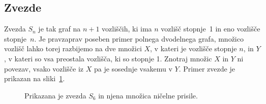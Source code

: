 \documentclass[12pt,a4paper,twoside]{article}
\theoremstyle{definition} %
\theoremstyle{plain} %
\numberwithin{equation}{section}  %
\begin{document}
\subsection{Zvezde}
Zvezda $S_n$ je tak graf na $n+1$ vozliščih, ki ima $n$ vozlišč stopnje~1 in eno vozlišče stopnje~$n$. Je pravzaprav poseben primer polnega dvodelnega grafa, množico vozlišč lahko torej razbijemo na dve množici $X$, v kateri je vozlišče stopnje $n$, in $Y$, v kateri so vsa preostala vozlišča, ki so stopnje 1. Znotraj množic $X$ in $Y$ ni povezav, vsako vozlišče iz $X$ pa je sosednje vsakemu v $Y$. Primer zvezde je prikazan na sliki~\ref{fig:zvezda}.
\begin{figure}[h]
    \centering
    \caption{Prikazana je zvezda $S_6$ in njena množica ničelne prisile.}
    \label{fig:zvezda}
\end{figure}
\end{document}
